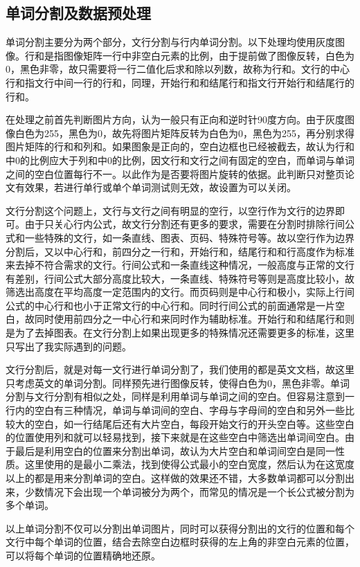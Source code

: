 \subsection{单词分割及数据预处理}
\noindent

单词分割主要分为两个部分，文行分割与行内单词分割。以下处理均使用灰度图像。行和是指图像矩阵一行中非空白元素的比例，由于提前做了图像反转，白色为0，黑色非零，故只需要将一行二值化后求和除以列数，故称为行和。文行的中心行和指文行中间一行的行和，同理，开始行和和结尾行和指文行开始行和结尾行的行和。

在处理之前首先判断图片方向，认为一般只有正向和逆时针90度方向。由于灰度图像白色为255，黑色为0，故先将图片矩阵反转为白色为0，黑色为255，再分别求得图片矩阵的行和和列和。如果图象是正向的，空白边框也已经被截去，故认为行和中0的比例应大于列和中0的比例，因文行和文行之间有固定的空白，而单词与单词之间的空白位置每行不一。以此作为是否要将图片旋转的依据。此判断只对整页论文有效果，若进行单行或单个单词测试则无效，故设置为可以关闭。

文行分割这个问题上，文行与文行之间有明显的空行，以空行作为文行的边界即可。由于只关心行内公式，故文行分割还有更多的要求，需要在分割时排除行间公式和一些特殊的文行，如一条直线、图表、页码、特殊符号等。故以空行作为边界分割后，又以中心行和，前四分之一行和，开始行和，结尾行和和行高度作为标准来去掉不符合需求的文行。行间公式和一条直线这种情况，一般高度与正常的文行有差别，行间公式大部分高度比较大，一条直线、特殊符号等则是高度比较小，故筛选出高度在平均高度一定范围内的文行。而页码则是中心行和极小，实际上行间公式的中心行和也小于正常文行的中心行和。同时行间公式的前面通常是一片空白，故同时使用前四分之一中心行和来同时作为辅助标准。开始行和和结尾行和则是为了去掉图表。在文行分割上如果出现更多的特殊情况还需要更多的标准，这里只写出了我实际遇到的问题。

文行分割后，就是对每一文行进行单词分割了，我们使用的都是英文文档，故这里只考虑英文的单词分割。同样预先进行图像反转，使得白色为0，黑色非零。单词分割与文行分割有相似之处，同样是利用单词与单词之间的空白。但容易注意到一行内的空白有三种情况，单词与单词间的空白、字母与字母间的空白和另外一些比较大的空白，如一行结尾后还有大片空白，每段开始文行的开头空白等。这些空白的位置使用列和就可以轻易找到，接下来就是在这些空白中筛选出单词间空白。由于最后是利用空白的位置来分割出单词，故认为大片空白和单词间空白是同一性质。这里使用的是最小二乘法，找到使得公式最小的空白宽度，然后认为在这宽度以上的都是用来分割单词的空白。这样做的效果还不错，大多数单词都可以分割出来，少数情况下会出现一个单词被分为两个，而常见的情况是一个长公式被分割为多个单词。

以上单词分割不仅可以分割出单词图片，同时可以获得分割出的文行的位置和每个文行中每个单词的位置，结合去除空白边框时获得的左上角的非空白元素的位置，可以将每个单词的位置精确地还原。

